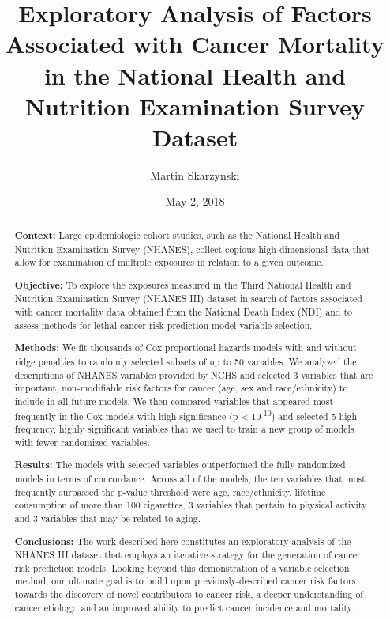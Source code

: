 \documentclass[12pt,oneside]{reedthesis}
\title{Exploratory Analysis of Factors Associated with Cancer Mortality in the
National Health and Nutrition Examination Survey Dataset}
\author{Martin Skarzynski}
\date{May 2, 2018}
\theoremstyle{definition}
\theoremstyle{definition}
\theoremstyle{definition}
\theoremstyle{remark}
\begin{document}
  \maketitle

\frontmatter %
\pagestyle{empty} %





  \begin{abstract}
    \textbf{Context:} Large epidemiologic cohort studies, such as the
    National Health and Nutrition Examination Survey (NHANES), collect
    copious high-dimensional data that allow for examination of multiple
    exposures in relation to a given outcome.
    
    \textbf{Objective:} To explore the exposures measured in the Third
    National Health and Nutrition Examination Survey (NHANES III) dataset in
    search of factors associated with cancer mortality data obtained from
    the National Death Index (NDI) and to assess methods for lethal cancer
    risk prediction model variable selection.
    
    \textbf{Methods:} We fit thousands of Cox proportional hazards models
    with and without ridge penalties to randomly selected subsets of up to
    50 variables. We analyzed the descriptions of NHANES variables provided
    by NCHS and selected 3 variables that are important, non-modifiable risk
    factors for cancer (age, sex and race/ethnicity) to include in all
    future models. We then compared variables that appeared most frequently
    in the Cox models with high significance (p \textless{}
    10\textsuperscript{-10}) and selected 5 high-frequency, highly
    significant variables that we used to train a new group of models with
    fewer randomized variables.
    
    \textbf{Results:} The models with selected variables outperformed the
    fully randomized models in terms of concordance. Across all of the
    models, the ten variables that most frequently surpassed the p-value
    threshold were age, race/ethnicity, lifetime consumption of more than
    100 cigarettes, 3 variables that pertain to physical activity and 3
    variables that may be related to aging.
    
    \textbf{Conclusions:} The work described here constitutes an exploratory
    analysis of the NHANES III dataset that employs an iterative strategy
    for the generation of cancer risk prediction models. Looking beyond this
    demonstration of a variable selection method, our ultimate goal is to
    build upon previously-described cancer risk factors towards the
    discovery of novel contributors to cancer risk, a deeper understanding
    of cancer etiology, and an improved ability to predict cancer incidence
    and mortality.
  \end{abstract}
\end{document}
